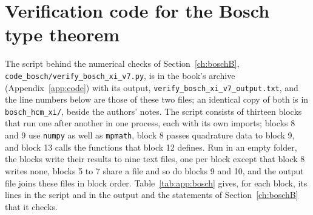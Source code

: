 \chapter{Verification code for the Bosch type theorem}\label{app:bosch}

The script behind the numerical checks of Section~\ref{ch:boschB}, \texttt{code\_bosch/\allowbreak verify\_\allowbreak bosch\_\allowbreak xi\_\allowbreak v7.py}, is in the book's archive (Appendix~\ref{app:code}) with its output, \texttt{verify\_\allowbreak bosch\_\allowbreak xi\_\allowbreak v7\_\allowbreak output.txt}, and the line numbers below are those of these two files; an identical copy of both is in \texttt{bosch\_hcm\_xi/}, beside the authors' notes. The script consists of thirteen blocks that run one after another in one process, each with its own imports; blocks 8 and 9 use \texttt{numpy} as well as \texttt{mpmath}, block 8 passes quadrature data to block 9, and block 13 calls the functions that block 12 defines. Run in an empty folder, the blocks write their results to nine text files, one per block except that block 8 writes none, blocks 5 to 7 share a file and so do blocks 9 and 10, and the output file joins these files in block order. Table~\ref{tab:app:bosch} gives, for each block, its lines in the script and in the output and the statements of Section~\ref{ch:boschB} that it checks.

